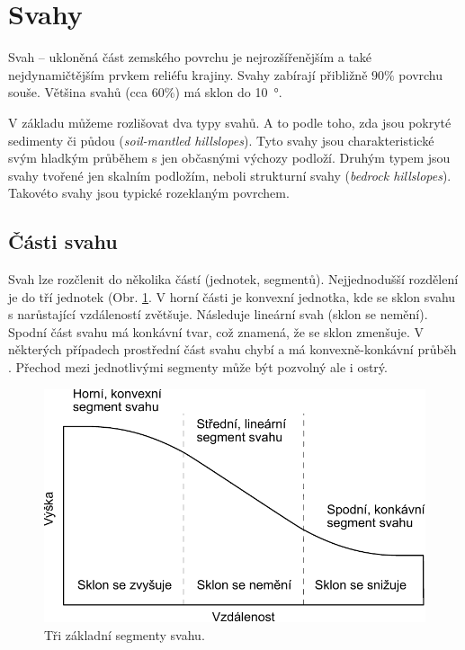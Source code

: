 \section{Svahy}
Svah -- ukloněná část zemského povrchu je nejrozšířenějším a také nejdynamičtějším prvkem reliéfu krajiny. Svahy zabírají přibližně $90 \%$ povrchu souše. Většina svahů (cca $60 \%$) má sklon do \SI{10}{\degree}. 

V základu můžeme rozlišovat dva typy svahů.  A to podle toho, zda jsou pokryté sedimenty či půdou (\textit{soil-mantled hillslopes}). Tyto svahy jsou charakteristické svým hladkým průběhem s jen občasnými výchozy podloží. Druhým typem jsou svahy tvořené jen skalním podložím, neboli strukturní svahy (\textit{bedrock hillslopes}). Takovéto svahy jsou typické rozeklaným povrchem.


\subsection{Části svahu}
Svah lze rozčlenit do několika částí (jednotek, segmentů). Nejjednodušší rozdělení je do tří jednotek (Obr. \ref{fig:segmenty_svahu}. V horní části je konvexní jednotka, kde se sklon svahu s narůstající vzdáleností zvětšuje. Následuje lineární svah (sklon se nemění). Spodní část svahu má konkávní tvar, což znamená, že se sklon zmenšuje. V některých případech prostřední část svahu chybí a má konvexně-konkávní průběh \parencite{whiteConvexConcaveLandslopesGeometrical1966}. Přechod mezi jednotlivými segmenty může být pozvolný ale i ostrý.

\begin{figure}[h]
	\centering
	\includegraphics[width=1\linewidth]{obrazky/slope/segmenty_svahu}
	\caption{Tři základní segmenty svahu.}
	\label{fig:segmenty_svahu}
\end{figure}


